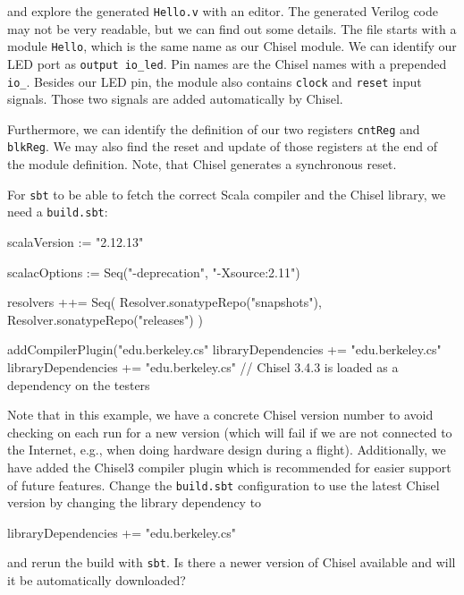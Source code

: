 \documentclass[%
    10pt,
    headinclude, footexclude,
    openright, %
    notitlepage,
    cleardoubleempty,
    headsepline,
    pointlessnumbers,
    bibtotoc, idxtotoc,
    ]{scrbook}
\newcommand{\code}[1]{{\small{\texttt{#1}}}}
\begin{document}
and explore the generated \code{Hello.v} with an editor. The generated Verilog code may not be
very readable, but we can find out some details. The file starts with a module \code{Hello},
which is the same name as our Chisel module. We can identify our LED port as
\code{output io\_led}. Pin names are the Chisel names with a prepended \code{io\_}.
Besides our LED pin, the module also contains \code{clock} and \code{reset} input signals.
Those two signals are added automatically by Chisel.

Furthermore, we can identify the definition of our two registers \code{cntReg} and \code{blkReg}.
We may also find the reset and update of those registers at the end of the module definition.
Note, that Chisel generates a synchronous reset.

For \code{sbt} to be able to fetch the correct Scala compiler and the Chisel library,
we need a \code{build.sbt}:

\begin{chisel}
scalaVersion := "2.12.13"

scalacOptions := Seq("-deprecation", "-Xsource:2.11")

resolvers ++= Seq(
  Resolver.sonatypeRepo("snapshots"),
  Resolver.sonatypeRepo("releases")
)

addCompilerPlugin("edu.berkeley.cs" %
libraryDependencies += "edu.berkeley.cs" %
libraryDependencies += "edu.berkeley.cs" %
// Chisel 3.4.3 is loaded as a dependency on the testers
\end{chisel}

\noindent Note that in this example, we have a concrete Chisel version number to avoid checking on
each run for a new version (which will fail if we are not connected to the Internet,
e.g., when doing hardware design during a flight). Additionally, we have added the Chisel3 compiler
plugin which is recommended for easier support of future features.
Change the \code{build.sbt} configuration to use the latest Chisel version by changing the
library dependency to

\begin{chisel}
libraryDependencies += "edu.berkeley.cs" %
\end{chisel}

\noindent and rerun the build with \code{sbt}. Is there a newer version of Chisel
available and will it be automatically downloaded?
\end{document}
